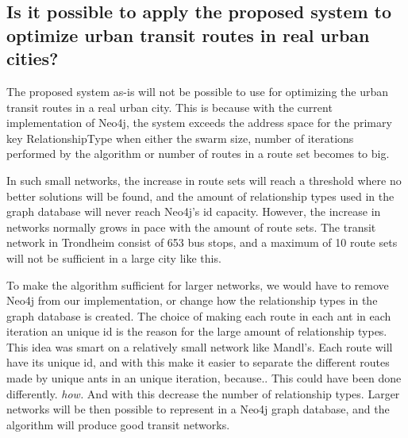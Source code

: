 

\subsection{Is it possible to apply the proposed system to optimize urban transit routes in real urban cities?}

The proposed system as-is will not be possible to use for optimizing the urban transit routes in a real urban city. This is because with the current implementation of Neo4j, the system exceeds the address space for the primary key RelationshipType when either the swarm size, number of iterations performed by the algorithm or number of routes in a route set becomes to big.  

In such small networks, the increase in route sets will reach a threshold where no better solutions will be found, and the amount of relationship types used in the graph database will never reach Neo4j's id capacity. However, the increase in networks normally grows in pace with the amount of route sets. The transit network in Trondheim consist of 653 bus stops\citep{website:rutebok}, and a maximum of 10 route sets will not be sufficient in a large city like this. %

To make the algorithm sufficient for larger networks, we would have to remove Neo4j from our implementation, or change how the relationship types in the graph database is created. The choice of making each route in each ant in each iteration an unique id is the reason for the large amount of relationship types. This idea was smart on a relatively small network like Mandl's. Each route will have its unique id, and with this make it easier to separate the different routes made by unique ants in an unique iteration, because.. This could have been done differently. \emph{\color{blue} how.} And with this decrease the number of relationship types. Larger networks will be then possible to represent in a Neo4j graph database, and the algorithm will produce good transit networks.

